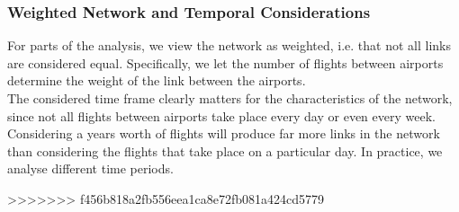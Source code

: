\subsubsection{Weighted Network and Temporal Considerations}
For parts of the analysis, we view the network as weighted, i.e. that not all links are considered equal. Specifically, we let the number of flights between airports determine the weight of the link between the airports. 
\medskip \\
The considered time frame clearly matters for the characteristics of the network, since not all flights between airports take place every day or even every week. Considering a years worth of flights will produce far more links in the network than considering the flights that take place on a particular day. In practice, we analyse different time periods. 


>>>>>>> f456b818a2fb556eea1ca8e72fb081a424cd5779


